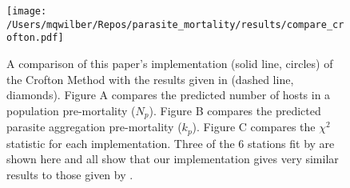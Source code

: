 \documentclass[12pt, a4paper]{article}
\begin{document}
\begin{figure}
    \centering
    \texttt{[image: /Users/mqwilber/Repos/parasite\_mortality/results/compare\_crofton.pdf]}
    \caption{A comparison of this paper's implementation (solid line, circles) of the Crofton Method with the results given in \cite{Crofton1971a} (dashed line, diamonds).  Figure A compares the predicted number of hosts in a population pre-mortality ($N_p$). Figure B compares the predicted parasite aggregation pre-mortality ($k_p$).  Figure C compares the $\chi^2$ statistic for each implementation.  Three of the 6 stations fit by \citeauthor{Crofton1971a} are shown here and all show that our implementation gives very similar results to those given by \citeauthor{Crofton1971a}.}
    \label{fig:crof_test}

\end{figure}
\end{document}
